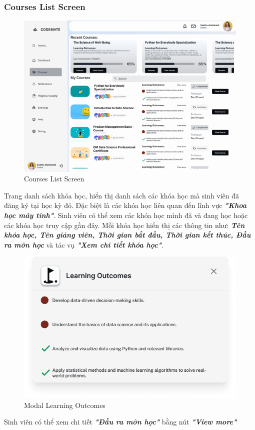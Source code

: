 \subsubsection{Courses List Screen}
\begin{figure}[H]
    \centering
    \includegraphics[width=0.7\linewidth]{Images/figmaDesign/Courses List Page.png}
    \caption{Courses List Screen}
    \label{fig:enter-label}
\end{figure}
Trang danh sách khóa học, hiển thị danh sách các khóa học mà sinh viên đã đăng ký tại học kỳ đó. Đặc biệt là các khóa học liên quan đến lĩnh vực \textbf{\textit{"Khoa học máy tính"}}. Sinh viên có thể xem các khóa học mình đã và đang học hoặc các khóa học truy cập gần đây. Mỗi khóa học hiển thị các thông tin như: \textbf{\textit{Tên khóa học, Tên giảng viên, Thời gian bắt đầu, Thời gian kết thúc, Đầu ra môn học}} và tác vụ \textbf{\textit{"Xem chi tiết khóa học"}}.
\begin{figure}[H]
    \centering
    \includegraphics[width=0.7\linewidth]{Images/figmaDesign/Modal Learning Outcomes.png}
    \caption{Modal Learning Outcomes}
    \label{fig:enter-label}
\end{figure}
Sinh viên có thể xem chi tiết \textbf{\textit{"Đầu ra môn học"}} bằng nút \textbf{\textit{"View more"}}
